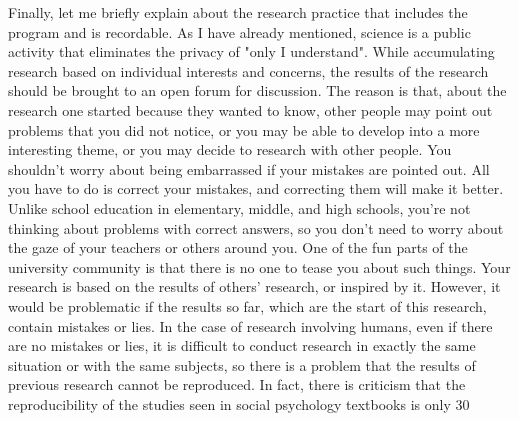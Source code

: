 \documentclass{ltjsbook}
\begin{document}
Finally, let me briefly explain about the research practice that includes the program and is recordable. As I have already mentioned, science is a public activity that eliminates the privacy of "only I understand". While accumulating research based on individual interests and concerns, the results of the research should be brought to an open forum for discussion. The reason is that, about the research one started because they wanted to know, other people may point out problems that you did not notice, or you may be able to develop into a more interesting theme, or you may decide to research with other people. You shouldn't worry about being embarrassed if your mistakes are pointed out. All you have to do is correct your mistakes, and correcting them will make it better. Unlike school education in elementary, middle, and high schools, you're not thinking about problems with correct answers, so you don't need to worry about the gaze of your teachers or others around you. One of the fun parts of the university community is that there is no one to tease you about such things. Your research is based on the results of others' research, or inspired by it. However, it would be problematic if the results so far, which are the start of this research, contain mistakes or lies. In the case of research involving humans, even if there are no mistakes or lies, it is difficult to conduct research in exactly the same situation or with the same subjects, so there is a problem that the results of previous research cannot be reproduced. In fact, there is criticism that the reproducibility of the studies seen in social psychology textbooks is only 30%
\end{document}
